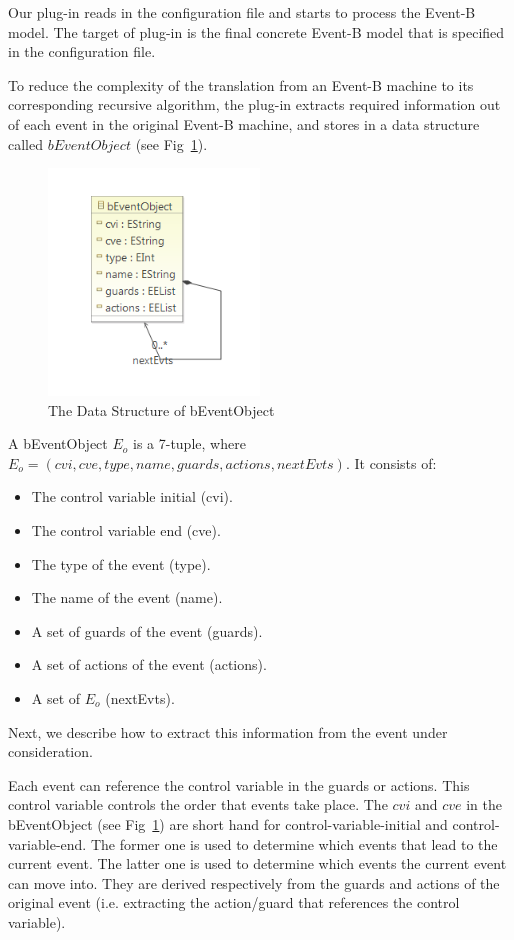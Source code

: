 \documentclass{easychair}
\begin{document}
Our plug-in reads in the configuration file and starts to process the Event-B model. The target of plug-in is the final concrete Event-B model that is specified in the configuration file.

To reduce the complexity of the translation from an Event-B machine to its corresponding recursive algorithm, the plug-in extracts required information out of each event in the original Event-B machine, and stores in a data structure called $bEventObject$ (see Fig~\ref{fig:ebo}). 

\begin{figure}[!h]
  \centering
    \includegraphics[width=0.5\textwidth]{img/ebo.PNG}
  \caption{The Data Structure of bEventObject}
  \label{fig:ebo}
\end{figure}

A bEventObject $E_o$ is a 7-tuple, where $E_o = (cvi, cve, type, name, guards, actions, nextEvts)$. It consists of:
\begin{itemize}
	\item The control variable initial (cvi).
	\item The control variable end (cve).
	\item The type of the event (type).
	\item The name of the event (name).
	\item A set of guards of the event (guards).
	\item A set of actions of the event (actions).
	\item A set of $E_o$ (nextEvts). 
\end{itemize}
Next, we describe how to extract this information from the event under consideration.

Each event can reference the control variable in the guards or actions. This control variable controls the order that events take place. The $cvi$ and $cve$ in the bEventObject (see Fig~\ref{fig:ebo}) are short hand for control-variable-initial and control-variable-end. The former one is used to determine which events that lead to the current event. The latter one is used to determine which events the current event can move into. They are derived respectively from the guards and actions of the original event (i.e. extracting the action/guard that references the control variable).
\end{document}
